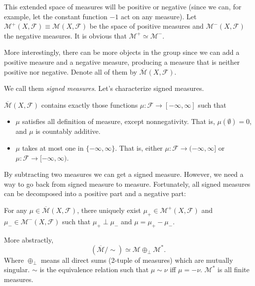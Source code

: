 This extended space of measures will be positive or negative (since we can, for example, let the constant function $-1$ act on any measure). Let $\mathcal{M}^+(X, \mathcal{F}) \equiv \mathcal{M}(X, \mathcal{F})$ be the space of positive measures and $\mathcal{M}^-(X, \mathcal{F})$ the negative measures. It is obvious that $\mathcal{M}^+ \simeq \mathcal{M}^-$. 

More interestingly, there can be more objects in the group since we can add a positive measure and a negative measure, producing a measure that is neither positive nor negative. Denote all of them by $\overline{\mathcal{M}}(X, \mathcal{F}) $.

We call them  \textit{signed measures}. Let's characterize signed measures.

\begin{proposition}
	$\overline{\mathcal{M}}(X, \mathcal{F}) $ contains exactly those functions $\mu: \mathcal{F} \to [- \infty , \infty ]$ such that
	\begin{itemize}
		\item $\mu$ satisfies all definition of measure, except nonnegativity. That is, $\mu(\emptyset ) =0$, and $\mu$ is countably additive.
		\item $\mu$ takes at most one in $\{- \infty , \infty \} $. That is, either $\mu: \mathcal{F} \to (- \infty , \infty ] $ or $\mu: \mathcal{F} \to  [- \infty , \infty ) $.
	\end{itemize}
\end{proposition}

By subtracting two measures we can get a signed measure. However, we need a way to go back from signed measure to measure. Fortunately, all signed measures can be decomposed into a positive part and a negative part:

\begin{theorem}
	For any $\mu \in \overline{\mathcal{M}}(X, \mathcal{F})$, there uniquely exist $\mu_+ \in \mathcal{M}^+(X, \mathcal{F})$ and $\mu_- \in \mathcal{M}^-(X, \mathcal{F})$ such that $\mu_+ \perp \mu_-$ and $\mu = \mu_+ - \mu_-$.

	More abstractly,
	\[
		(\overline{\mathcal{M}}/\sim) \simeq \mathcal{M} \oplus_\perp \mathcal{M}^*
	.\] 
	Where $\oplus_\perp$ means all direct sums (2-tuple of measures) which are mutually singular. $\sim$ is the equivalence relation such that $\mu \sim \nu$ iff $\mu = - \nu$. $\mathcal{M}^*$ is all finite measures.
\end{theorem}

